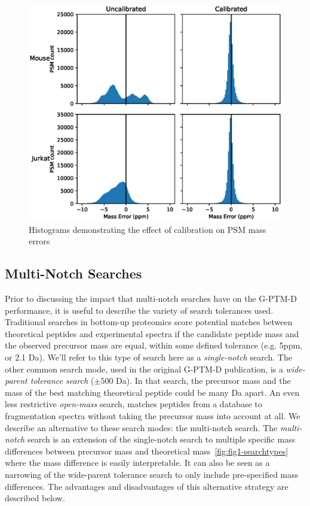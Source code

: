 \documentclass[journal=jprobs,manuscript=article]{achemso}
\begin{document}
\begin{figure}
  \includegraphics{fig2-calibrationQuality.eps}
  \caption{Histograms demonstrating the effect of calibration on PSM mass errors}
  \label{fgr:figure1}
\end{figure}

\newpage

\subsection{Multi-Notch Searches}

Prior to discussing the impact that multi-notch searches have on the G-PTM-D performance, it is useful to describe the variety of search tolerances used.
Traditional searches in bottom-up proteomics score potential matches between theoretical peptides and experimental spectra if the candidate peptide mass and the observed precursor mass are equal, within some defined tolerance (e.g. 5ppm, or 2.1 Da).
We'll refer to this type of search here as a \textit{single-notch} search.
The other common search mode, used in the original G-PTM-D publication, is a \textit{wide-parent tolerance search} ($\pm 500$ Da).
In that search, the precursor mass and the mass of the best matching theoretical peptide could be many Da apart.
An even less restrictive \textit{open-mass} search, matches peptides from a database to fragmentation spectra without taking the precursor mass into account at all.
We describe an alternative to these search modes: the multi-notch search.
The \textit{multi-notch} search is an extension of the single-notch search to multiple specific mass differences between precursor mass and theoretical mass~\ref{fig:fig1-searchtypes} where the mass difference is easily interpretable.
It can also be seen as a narrowing of the wide-parent tolerance search to only include pre-specified mass differences.
The advantages and disadvantages of this alternative strategy are described below.
\end{document}

